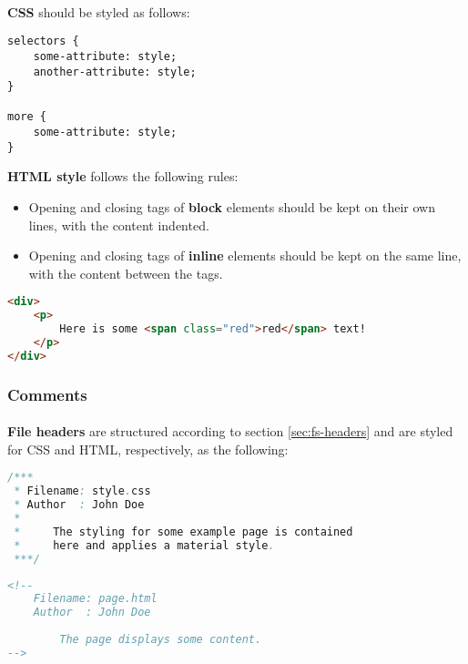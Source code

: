 \documentclass{article}
\begin{document}
    \paragraph{}
    \textbf{CSS} should be styled as follows:

    \begin{lstlisting}
selectors {
    some-attribute: style;
    another-attribute: style;
}

more {
    some-attribute: style;
}
    \end{lstlisting}

    \textbf{HTML style} follows the following rules:

    \begin{itemize}
        \item Opening and closing tags of \textbf{block} elements should be kept
            on their own lines, with the content indented.
        \item Opening and closing tags of \textbf{inline} elements should be
            kept on the same line, with the content between the tags.
    \end{itemize}

    \begin{lstlisting}[language=html]
<div>
    <p>
        Here is some <span class="red">red</span> text!
    </p>
</div>
    \end{lstlisting}

    \subsubsection{Comments}
    \label{sec:ls-html-com}

    \paragraph{}
    \textbf{File headers} are structured according to section
    \ref{sec:fs-headers} and are styled for CSS and HTML, respectively, as
    the following:

    \begin{lstlisting}[language=java]
/***
 * Filename: style.css
 * Author  : John Doe
 *
 *     The styling for some example page is contained
 *     here and applies a material style.
 ***/
    \end{lstlisting}

    \begin{lstlisting}[language=html]
<!--
    Filename: page.html
    Author  : John Doe
    
        The page displays some content.
-->
    \end{lstlisting}
\end{document}
